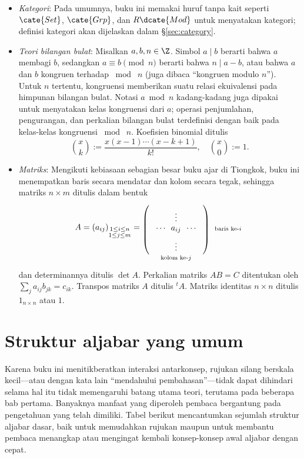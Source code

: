 \begin{itemize}
		Untuk bilangan real, notasi $\gg$ berarti ``cukup lebih besar daripada''. Misalnya, $x \gg 0$ berarti bahwa bilangan positif $x$ cukup besar, sedangkan $0 < x \ll 1$ berarti bahwa bilangan positif $x$ cukup dekat dengan $0$.

	\item \emph{Kategori}: Pada umumnya, buku ini memakai huruf tanpa kait seperti $\cate{Set}$, $\cate{Grp}$, dan $R\dcate{Mod}$ untuk menyatakan kategori; definisi kategori akan dijelaskan dalam \S\ref{sec:category}.
	
	\item \emph{Teori bilangan bulat}: Misalkan $a,b,n \in \Z$. Simbol $a \mid b$ berarti bahwa $a$ membagi $b$, sedangkan $a \equiv b \pmod n$ berarti bahwa $n \mid a-b$, atau bahwa $a$ dan $b$ kongruen terhadap $\bmod\; n$ (juga dibaca ``kongruen modulo $n$''). Untuk $n$ tertentu, kongruensi memberikan suatu relasi ekuivalensi pada himpunan bilangan bulat. Notasi $a \bmod n$ kadang-kadang juga dipakai untuk menyatakan kelas kongruensi dari $a$; operasi penjumlahan, pengurangan, dan perkalian bilangan bulat terdefinisi dengan baik pada kelas-kelas kongruensi $\bmod\; n$. Koefisien binomial ditulis
		\[ \binom{x}{k} := \frac{x(x-1) \cdots (x-k+1)}{k!}, \quad \binom{x}{0} := 1. \]
	
	\item \emph{Matriks}: Mengikuti kebiasaan sebagian besar buku ajar di Tiongkok, buku ini menempatkan baris secara mendatar dan kolom secara tegak, sehingga matriks $n \times m$ ditulis dalam bentuk
		\[ A = (a_{ij})_{\substack{1 \leq i \leq n \\ 1 \leq j \leq m}} = \begin{tikzpicture}[baseline]
			\matrix (M) [matrix of math nodes, left delimiter=(, right delimiter=)] {
				& \vdots & \\
				\cdots & a_{ij} & \cdots \\
				& \vdots & \\
			};
		\node[right=2.5em] at (M-2-3) {\scriptsize baris ke-$i$};
		\node[below=1em] at (M-3-2) {\scriptsize kolom ke-$j$};
	\end{tikzpicture}\]
	dan determinannya ditulis $\det A$. Perkalian matriks $AB=C$ ditentukan oleh $\sum_j a_{ij} b_{jk} = c_{ik}$. Transpos matriks $A$ ditulis ${}^t A$. Matriks identitas $n \times n$ ditulis $1_{n \times n}$ atau $1$.
\end{itemize}

\section*{Struktur aljabar yang umum}
Karena buku ini menitikberatkan interaksi antarkonsep, rujukan silang berskala kecil—atau dengan kata lain ``mendahului pembahasan''—tidak dapat dihindari selama hal itu tidak memengaruhi batang utama teori, terutama pada beberapa bab pertama. Banyaknya manfaat yang diperoleh pembaca bergantung pada pengetahuan yang telah dimiliki. Tabel berikut mencantumkan sejumlah struktur aljabar dasar, baik untuk memudahkan rujukan maupun untuk membantu pembaca menangkap atau mengingat kembali konsep-konsep awal aljabar dengan cepat.

